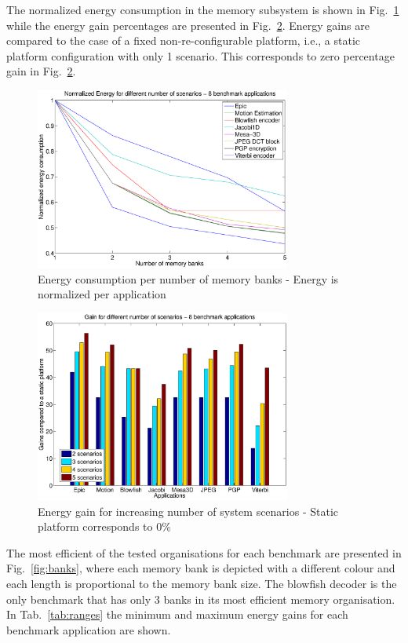 \documentclass[smallextended]{svjour3}
\begin{document}
The normalized energy consumption in the memory subsystem is shown in Fig.~\ref{fig:energy} while the energy gain percentages are presented in Fig.~\ref{fig:gains}. 
Energy gains are compared to the case of a fixed non-re-configurable platform, i.e., a static platform configuration with only 1 scenario. 
This corresponds to zero percentage gain in Fig.~\ref{fig:gains}. 

\begin{figure}
\centering
\includegraphics[width=0.75\textwidth]{Images/6apps.eps}
\caption{Energy consumption per number of memory banks - Energy is normalized per application}
\label{fig:energy}
\end{figure}

\begin{figure}
\centering
\includegraphics[width=0.75\textwidth]{Images/6appsGains.eps}
\caption{Energy gain for increasing number of system scenarios - Static platform corresponds to 0\%}
\label{fig:gains}
\end{figure}

The most efficient of the tested organisations for each benchmark are presented in Fig.~\ref{fig:banks}, where each memory bank is depicted with a different colour and each length is proportional to the memory bank size. 
The blowfish decoder is the only benchmark that has only 3 banks in its most efficient memory organisation. 
In Tab.~\ref{tab:ranges} the minimum and maximum energy gains for each benchmark application are shown. 
\end{document}
